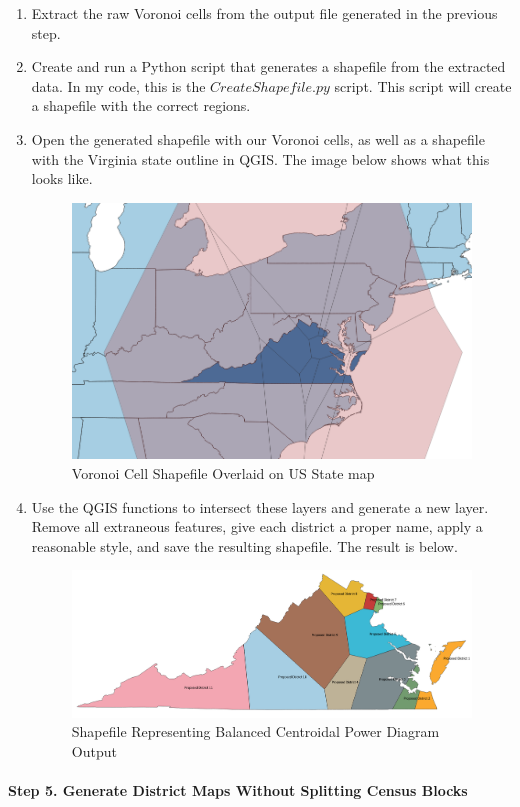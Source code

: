 \documentclass[11pt]{article}
\begin{document}
\begin{enumerate}
	\item Extract the raw Voronoi cells from the output file generated in the previous step.
	\item Create and run a Python script that generates a shapefile from the extracted data. In my code, this is the $CreateShapefile.py$ script. This script will create a shapefile with the correct regions.
	\item Open the generated shapefile with our Voronoi cells, as well as a shapefile with the Virginia state outline in QGIS. The image below shows what this looks like.
	\begin{figure}[H]
		\centering
		\includegraphics[width=.6\textwidth]{5a3_Overlay}
		\caption{Voronoi Cell Shapefile Overlaid on US State map}
		\label{fig:vcusmap}
	\end{figure}
	\item Use the QGIS functions to intersect these layers and generate a new layer. Remove all extraneous features, give each district a proper name, apply a reasonable style, and save the resulting shapefile. The result is below.
	\begin{figure}[H]
		\centering
		\includegraphics[width=.6\textwidth]{5a4_Final}
		\caption{Shapefile Representing Balanced Centroidal Power Diagram Output}
		\label{fig:shp4bcpd}
	\end{figure}
\end{enumerate}

\paragraph{Step 5. Generate District Maps Without Splitting Census Blocks}
\end{document}
